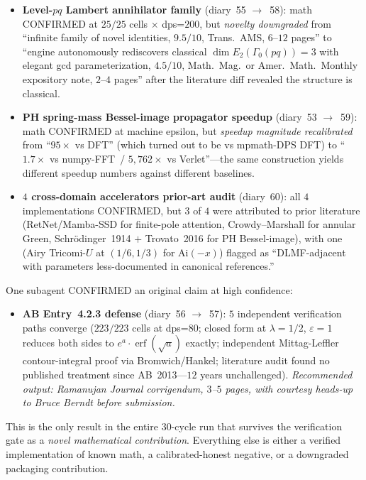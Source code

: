 \documentclass[11pt,reqno]{amsart}
\theoremstyle{definition}
\begin{document}
\begin{itemize}[leftmargin=2em]
\item \textbf{Level-$pq$ Lambert annihilator family} (diary~55
$\to$~58): math CONFIRMED at $25/25$ cells $\times$ dps=$200$, but
\emph{novelty downgraded} from ``infinite family of novel identities,
$9.5/10$, Trans.\ AMS, $6$--$12$ pages'' to ``engine autonomously
rediscovers classical $\dim E_2(\Gamma_0(pq)) = 3$ with elegant gcd
parameterization, $4.5/10$, Math.\ Mag.\ or Amer.\ Math.\ Monthly
expository note, $2$--$4$ pages'' after the literature diff revealed
the structure is classical.

\item \textbf{PH spring-mass Bessel-image propagator speedup}
(diary~53 $\to$~59): math CONFIRMED at machine epsilon, but
\emph{speedup magnitude recalibrated} from ``$95\times$ vs DFT''
(which turned out to be vs mpmath-DPS DFT) to ``$1.7\times$ vs
numpy-FFT~/ $5{,}762\times$ vs Verlet''---the same construction
yields different speedup numbers against different baselines.

\item \textbf{$4$ cross-domain accelerators prior-art audit}
(diary~60): all $4$ implementations CONFIRMED, but $3$ of $4$ were
attributed to prior literature (RetNet/Mamba-SSD for finite-pole
attention, Crowdy--Marshall for annular Green, Schr\"odinger~1914
$+$ Trovato~2016 for PH Bessel-image), with one (Airy Tricomi-$U$ at
$(1/6, 1/3)$ for $\mathrm{Ai}(-x)$) flagged as ``DLMF-adjacent with
parameters less-documented in canonical references.''
\end{itemize}

One subagent CONFIRMED an original claim at high confidence:

\begin{itemize}[leftmargin=2em]
\item \textbf{AB Entry~4.2.3 defense} (diary~56 $\to$~57): $5$
independent verification paths converge ($223/223$ cells at
dps=$80$; closed form at $\lambda=1/2$, $\varepsilon=1$ reduces
both sides to $e^a \cdot \operatorname{erf}(\sqrt{a})$ exactly;
independent Mittag-Leffler contour-integral proof via
Bromwich/Hankel; literature audit found no published treatment
since AB~2013---$12$ years unchallenged). \emph{Recommended output:
Ramanujan Journal corrigendum, $3$--$5$ pages, with courtesy
heads-up to Bruce Berndt before submission.}
\end{itemize}

This is the only result in the entire $30$-cycle run that survives
the verification gate as a \emph{novel mathematical contribution}.
Everything else is either a verified implementation of known math,
a calibrated-honest negative, or a downgraded packaging contribution.
\end{document}
